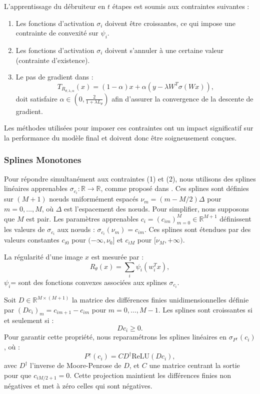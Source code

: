 \documentclass[a4paper, 12pt]{report} %
\begin{document}
L'apprentissage du débruiteur en \( t \) étapes est soumis aux contraintes suivantes :

\begin{enumerate}
    \item Les fonctions d'activation \( \sigma_i \) doivent être croissantes, ce qui impose une contrainte de convexité sur \( \psi_i \).
    \item Les fonctions d'activation \( \sigma_i \) doivent s'annuler à une certaine valeur (contrainte d'existence).
    \item Le pas de gradient dans :
    \[
    T_{R_{\theta, \lambda, \alpha}}(x) = (1 - \alpha)x + \alpha \left( y - \lambda W^T \sigma(Wx) \right),
    \]
    doit satisfaire \( \alpha \in \left(0, \frac{2}{1 + \lambda L_\theta}\right) \) afin d’assurer la convergence de la descente de gradient.
\end{enumerate}

Les méthodes utilisées pour imposer ces contraintes ont un impact significatif sur la performance du modèle final et doivent donc être soigneusement conçues.

\subsubsection{Splines Monotones}

Pour répondre simultanément aux contraintes (1) et (2), nous utilisons des splines linéaires apprenables \( \sigma_{c_i} : \mathbb{R} \to \mathbb{R} \), comme proposé dans \cite{bohra2021learning,bohra2020learning}. Ces splines sont définies sur \( (M + 1) \) nœuds uniformément espacés \( \nu_m = (m - M/2) \Delta \) pour \( m = 0, \ldots, M \), où \( \Delta \) est l’espacement des nœuds. Pour simplifier, nous supposons que \( M \) est pair. Les paramètres apprenables \( c_i = (c_{i m})_{m=0}^M \in \mathbb{R}^{M+1} \) définissent les valeurs de \( \sigma_{c_i} \) aux nœuds : \( \sigma_{c_i}(\nu_m) = c_{i m} \). Ces splines sont étendues par des valeurs constantes \( c_{i 0} \) pour \( (-\infty, \nu_0] \) et \( c_{i M} \) pour \( [\nu_M, +\infty) \).

La régularité d’une image \( x \) est mesurée par :
\[
R_\theta(x) = \sum_{i} \psi_i(w_i^T x),
\]
  \(\psi_i\)= sont des fonctions convexes associées aux splines \(\sigma_{c_i}\).

Soit \( D \in \mathbb{R}^{M \times (M+1)} \) la matrice des différences finies unidimensionnelles définie par \( (D c_i)_m = c_{i m+1} - c_{i m} \) pour \( m = 0, \ldots, M-1 \). Les splines sont croissantes si et seulement si :
\[
D c_i \geq 0.
\]
Pour garantir cette propriété, nous reparamétrons les splines linéaires en \( \sigma_{P^{\uparrow}}(c_i) \), où :
\[
P^{\uparrow}(c_i) = C D^{\dagger} \text{ReLU}(D c_i),
\]
avec \( D^{\dagger} \) l’inverse de Moore-Penrose de \( D \), et \( C \) une matrice centrant la sortie pour que \( c_{i M/2+1} = 0 \). Cette projection maintient les différences finies non négatives et met à zéro celles qui sont négatives.
\end{document}
